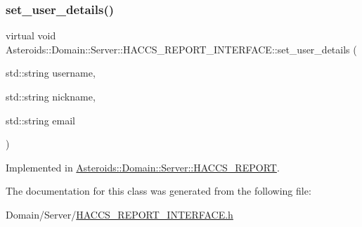 \subsubsection{\texorpdfstring{set\+\_\+user\+\_\+details()}{set\_user\_details()}}
{\footnotesize\ttfamily virtual void Asteroids\+::\+Domain\+::\+Server\+::\+H\+A\+C\+C\+S\+\_\+\+R\+E\+P\+O\+R\+T\+\_\+\+I\+N\+T\+E\+R\+F\+A\+C\+E\+::set\+\_\+user\+\_\+details (\begin{DoxyParamCaption}\item[{std\+::string}]{username,  }\item[{std\+::string}]{nickname,  }\item[{std\+::string}]{email }\end{DoxyParamCaption})\hspace{0.3cm}{\ttfamily [pure virtual]}}



Implemented in \hyperlink{classAsteroids_1_1Domain_1_1Server_1_1HACCS__REPORT_aac58cb81d18beb43c31cc11610dd319f}{Asteroids\+::\+Domain\+::\+Server\+::\+H\+A\+C\+C\+S\+\_\+\+R\+E\+P\+O\+RT}.



The documentation for this class was generated from the following file\+:\begin{DoxyCompactItemize}
\item 
Domain/\+Server/\hyperlink{HACCS__REPORT__INTERFACE_8h}{H\+A\+C\+C\+S\+\_\+\+R\+E\+P\+O\+R\+T\+\_\+\+I\+N\+T\+E\+R\+F\+A\+C\+E.\+h}\end{DoxyCompactItemize}
